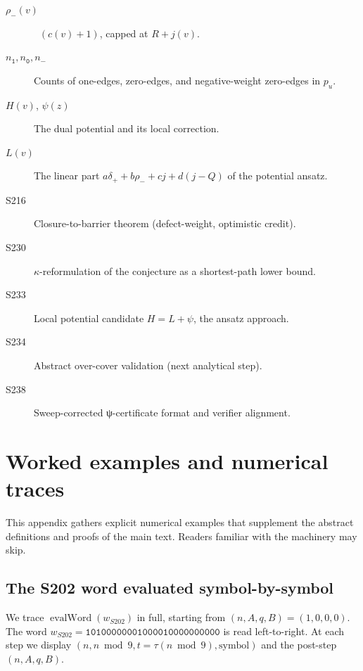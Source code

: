 \documentclass[11pt,a4paper]{article}
\theoremstyle{plain}
\theoremstyle{definition}
\newcommand{\wS}{w_{S202}}
\newcommand{\numOnes}{n_{\mathtt{1}}}
\newcommand{\numNeg}{n_{\!-}}
\newcommand{\numZeros}{n_{\mathtt{0}}}
\DeclareMathOperator{\evalWord}{evalWord}
\DeclareMathOperator{\nuthree}{\nu_3}
\begin{document}
\begin{description}
  \item[$\rho_-(v)$] $\nuthree(c(v) + 1)$, capped at $R + j(v)$.
  \item[$\numOnes, \numZeros, \numNeg$] Counts of one-edges,
        zero-edges, and negative-weight zero-edges in $p_u$.
  \item[$H(v)$, $\psi(z)$] The dual potential and its local
        correction.
  \item[$L(v)$] The linear part $a \delta_+ + b \rho_- + c j + d (j - Q)$
        of the potential ansatz.
  \item[S216] Closure-to-barrier theorem (defect-weight,
        optimistic credit).
  \item[S230] $\kappa$-reformulation of the conjecture as a
        shortest-path lower bound.
  \item[S233] Local potential candidate $H = L + \psi$, the
        ansatz approach.
  \item[S234] Abstract over-cover validation (next analytical
        step).
  \item[S238] Sweep-corrected ψ-certificate format and verifier
        alignment.
\end{description}

\section{Worked examples and numerical traces}\label{app:examples}

This appendix gathers explicit numerical examples that supplement the
abstract definitions and proofs of the main text. Readers familiar
with the machinery may skip.

\subsection{The S202 word evaluated symbol-by-symbol}

We trace $\evalWord(\wS)$ in full, starting from $(n, A, q, B) = (1, 0, 0, 0)$.
The word $\wS = \mathtt{10100000001000010000000000}$ is read
left-to-right. At each step we display
$(n, n \bmod 9, t = \tau(n \bmod 9), \text{symbol})$ and the
post-step $(n, A, q, B)$.
\end{document}
